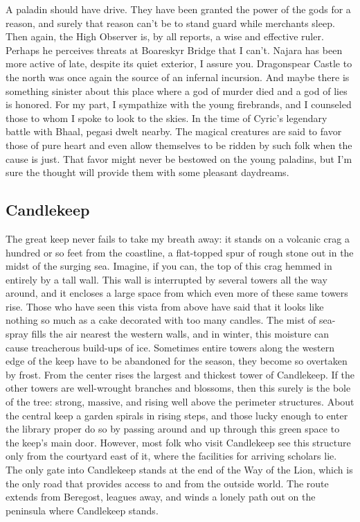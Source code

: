 \documentclass[10pt,a4paper,twoside,twocolumn,openany,bg=print,nodeprecatedcode]{dndbook}
\begin{document}
A paladin should have drive. They have been granted the power of the gods for a reason, and surely that reason can't be to stand guard while merchants sleep. Then again, the High Observer is, by all reports, a wise and effective ruler. Perhaps he perceives threats at Boareskyr Bridge that I can't. Najara has been more active of late, despite its quiet exterior, I assure you. Dragonspear Castle to the north was once again the source of an infernal incursion. And maybe there is something sinister about this place where a god of murder died and a god of lies is honored.
For my part, I sympathize with the young firebrands, and I counseled those to whom I spoke to look to the skies. In the time of Cyric's legendary battle with Bhaal, pegasi dwelt nearby. The magical creatures are said to favor those of pure heart and even allow themselves to be ridden by such folk when the cause is just. That favor might never be bestowed on the young paladins, but I'm sure the thought will provide them with some pleasant daydreams.
\subsection{Candlekeep}
The great keep never fails to take my breath away: it stands on a volcanic crag a hundred or so feet from the coastline, a flat-topped spur of rough stone out in the midst of the surging sea. Imagine, if you can, the top of this crag hemmed in entirely by a tall wall. This wall is interrupted by several towers all the way around, and it encloses a large space from which even more of these same towers rise. Those who have seen this vista from above have said that it looks like nothing so much as a cake decorated with too many candles. The mist of sea-spray fills the air nearest the western walls, and in winter, this moisture can cause treacherous build-ups of ice. Sometimes entire towers along the western edge of the keep have to be abandoned for the season, they become so overtaken by frost.
From the center rises the largest and thickest tower of Candlekeep. If the other towers are well-wrought branches and blossoms, then this surely is the bole of the tree: strong, massive, and rising well above the perimeter structures. About the central keep a garden spirals in rising steps, and those lucky enough to enter the library proper do so by passing around and up through this green space to the keep's main door. However, most folk who visit Candlekeep see this structure only from the courtyard east of it, where the facilities for arriving scholars lie.
The only gate into Candlekeep stands at the end of the Way of the Lion, which is the only road that provides access to and from the outside world. The route extends from Beregost, leagues away, and winds a lonely path out on the peninsula where Candlekeep stands.
\end{document}
